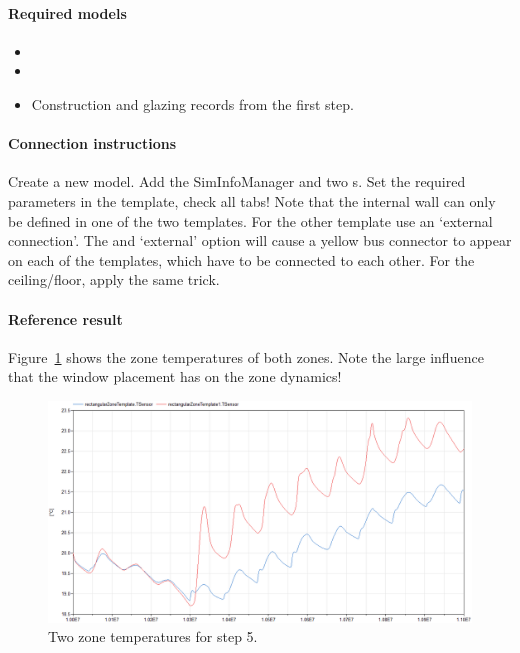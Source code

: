 \documentclass[10pt,a4paper]{article}
\begin{document}
\paragraph{Required models}
\begin{itemize}
\item {}
\item {}
\item Construction and glazing records from the first step.
\end{itemize}

\paragraph{Connection instructions}
Create a new model. Add the SimInfoManager and two s.
Set the required parameters in the template, check all tabs! 
Note that the internal wall can only be defined in one of the two templates.
For the other template use an `external connection'. 
The  and `external' option will cause a 
yellow bus connector to appear on each of the templates,
which have to be connected to each other.
For the ceiling/floor, apply the same trick.


\paragraph{Reference result}
Figure~\ref{fig:res5} shows the zone temperatures of both zones.
Note the large influence that the window placement has on the zone dynamics!



\begin{figure}
\centering
\includegraphics[scale=0.6]{Example5.png}
\caption{Two zone temperatures for step 5.}
\label{fig:res5}
\end{figure}
\end{document}
